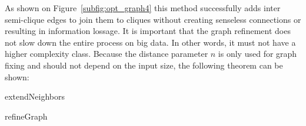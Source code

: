 As shown on Figure~\ref{subfig:opt_graph4} this method successfully adds inter semi-clique edges to join them to cliques without creating senseless connections or resulting in information lossage. It is important that the graph refinement does not slow down the entire process on big data. In other words, it must not have a higher complexity class. Because the distance parameter $n$ is only used for graph fixing and should not depend on the input size, the following theorem can be shown:

\begin{algorithm}


	\caption{extendNeighbors}
\end{algorithm}

\begin{algorithm}


	\caption{refineGraph}
\end{algorithm}

